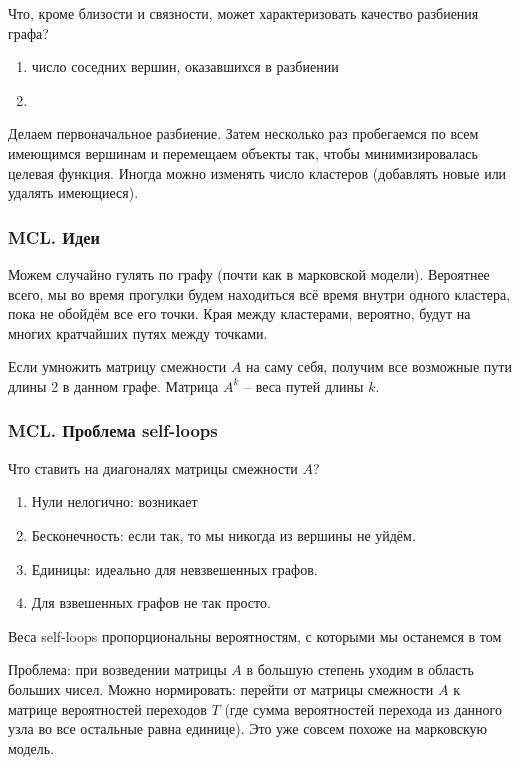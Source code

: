 \documentclass[main.tex]{subfiles}
\begin{document}
Что, кроме близости и связности, может характеризовать качество разбиения графа?

\begin{enumerate}[noitemsep]
	\item число соседних вершин, оказавшихся в разбиении
	\item %
\end{enumerate}

Делаем первоначальное разбиение.
Затем несколько раз пробегаемся по всем имеющимся вершинам и перемещаем объекты так, чтобы минимизировалась целевая функция.
Иногда можно изменять число кластеров (добавлять новые или удалять имеющиеся).

\subsubsection{MCL. Идеи}

Можем случайно гулять по графу (почти как в марковской модели).
Вероятнее всего, мы во время прогулки будем находиться всё время внутри одного кластера, пока не обойдём все его точки.
Края между кластерами, вероятно, будут на многих кратчайших путях между точками.

Если умножить матрицу смежности $A$ на саму себя, получим все возможные пути длины 2 в данном графе.
Матрица $A^k$ -- веса путей длины $k$.

\subsubsection{MCL. Проблема self-loops}

Что ставить на диагоналях матрицы смежности $A$?

\begin{enumerate}[noitemsep]
	\item Нули нелогично: возникает

	\item Бесконечность: если так, то мы никогда из вершины не уйдём.

	\item Единицы: идеально для невзвешенных графов.
	\item Для взвешенных графов не так просто.
\end{enumerate}


Веса self-loops пропорциональны вероятностям, с которыми мы останемся в том

Проблема: при возведении матрицы $A$ в большую степень уходим в область больших чисел.
Можно нормировать: перейти от матрицы смежности $A$ к матрице вероятностей переходов $T$ (где сумма вероятностей перехода из данного узла во все остальные равна единице).
Это уже совсем похоже на марковскую модель.
\end{document}

